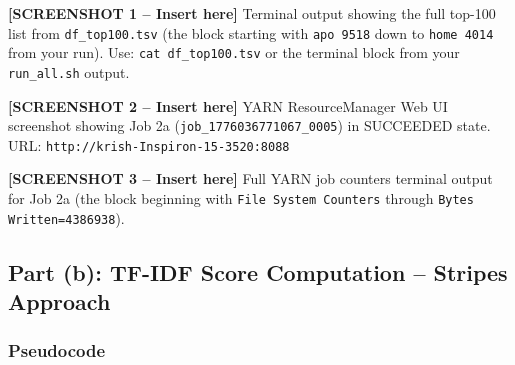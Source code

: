 \documentclass[12pt,a4paper]{article}
\begin{document}
\begin{mdframed}[backgroundcolor=yellow!15, linecolor=orange, linewidth=1pt]
\textbf{[SCREENSHOT 1 -- Insert here]}
Terminal output showing the full top-100 list from \texttt{df\_top100.tsv}
(the block starting with \texttt{apo~9518} down to \texttt{home~4014} from
your run).  Use: \verb|cat df_top100.tsv| or the terminal block from your
\texttt{run\_all.sh} output.
\end{mdframed}

\begin{mdframed}[backgroundcolor=yellow!15, linecolor=orange, linewidth=1pt]
\textbf{[SCREENSHOT 2 -- Insert here]}
YARN ResourceManager Web UI screenshot showing Job 2a
(\texttt{job\_1776036771067\_0005}) in SUCCEEDED state.
URL: \texttt{http://krish-Inspiron-15-3520:8088}
\end{mdframed}

\begin{mdframed}[backgroundcolor=yellow!15, linecolor=orange, linewidth=1pt]
\textbf{[SCREENSHOT 3 -- Insert here]}
Full YARN job counters terminal output for Job 2a (the block beginning with
\texttt{File System Counters} through \texttt{Bytes Written=4386938}).
\end{mdframed}

\subsection{Part (b): TF-IDF Score Computation -- Stripes Approach}

\subsubsection{Pseudocode}
\end{document}

